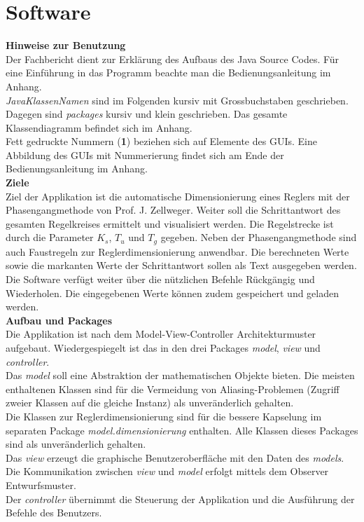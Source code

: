 \section{Software}
\textbf{Hinweise zur Benutzung}\\
Der Fachbericht dient zur Erklärung des Aufbaus des Java Source Codes. Für eine Einführung in das Programm beachte man die Bedienungsanleitung im Anhang.\\
\textit{JavaKlassenNamen} sind im Folgenden kursiv mit Grossbuchstaben geschrieben. Dagegen sind \textit{packages} kursiv und klein geschrieben. Das gesamte Klassendiagramm befindet sich im Anhang.\\
Fett gedruckte Nummern (\textbf{1}) beziehen sich auf Elemente des GUIs. Eine Abbildung des GUIs mit Nummerierung findet sich am Ende der Bedienungsanleitung im Anhang.\\

\textbf{Ziele}\\
Ziel der Applikation ist die automatische Dimensionierung eines Reglers mit der Phasengangmethode von Prof. J. Zellweger. Weiter soll die Schrittantwort des gesamten Regelkreises ermittelt und visualisiert werden. Die Regelstrecke ist durch die Parameter $K_s$, $T_u$ und $T_g$ gegeben. Neben der Phasengangmethode sind auch Faustregeln zur Reglerdimensionierung anwendbar. Die berechneten Werte sowie die markanten Werte der Schrittantwort sollen als Text ausgegeben werden. Die Software verfügt weiter über die nützlichen Befehle Rückgängig und Wiederholen. Die eingegebenen Werte können zudem gespeichert und geladen werden.\\

\textbf{Aufbau und Packages}\\
Die Applikation ist nach dem Model-View-Controller Architekturmuster aufgebaut. Wiedergespiegelt ist das in den drei Packages \textit{model}, \textit{view} und \textit{controller}.\\
Das \textit{model} soll eine Abstraktion der mathematischen Objekte bieten. Die meisten enthaltenen Klassen sind für die Vermeidung von Aliasing-Problemen (Zugriff zweier Klassen auf die gleiche Instanz) als unveränderlich gehalten.\\
Die Klassen zur Reglerdimensionierung sind für die bessere Kapselung im separaten Package \textit{model.dimensionierung} enthalten. Alle Klassen dieses Packages sind als unveränderlich gehalten.\\
Das \textit{view} erzeugt die graphische Benutzeroberfläche mit den Daten des \textit{models}. Die Kommunikation zwischen \textit{view} und \textit{model} erfolgt mittels dem Observer Entwurfsmuster.\\
Der \textit{controller} übernimmt die Steuerung der Applikation und die Ausführung der Befehle des Benutzers. 


